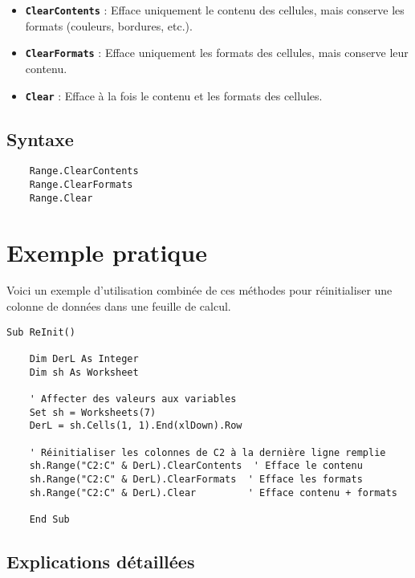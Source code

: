 \documentclass[a4paper,12pt]{report}
\begin{document}
\begin{itemize}
	\item \textbf{\texttt{ClearContents}} : Efface uniquement le contenu des cellules, mais conserve les formats (couleurs, bordures, etc.).
	\item \textbf{\texttt{ClearFormats}} : Efface uniquement les formats des cellules, mais conserve leur contenu.
	\item \textbf{\texttt{Clear}} : Efface à la fois le contenu et les formats des cellules.
\end{itemize}

\subsection*{Syntaxe}
\begin{verbatim}
	Range.ClearContents
	Range.ClearFormats
	Range.Clear
\end{verbatim}

\section{Exemple pratique}

Voici un exemple d'utilisation combinée de ces méthodes pour réinitialiser une colonne de données dans une feuille de calcul.
\newpage
\begin{lstlisting}[language=vbscript, caption={Exemple de réinitialisation avec \texttt{Clear}}]
	Sub ReInit()
	
	Dim DerL As Integer
	Dim sh As Worksheet
	
	' Affecter des valeurs aux variables
	Set sh = Worksheets(7)
	DerL = sh.Cells(1, 1).End(xlDown).Row
	
	' Réinitialiser les colonnes de C2 à la dernière ligne remplie
	sh.Range("C2:C" & DerL).ClearContents  ' Efface le contenu
	sh.Range("C2:C" & DerL).ClearFormats  ' Efface les formats
	sh.Range("C2:C" & DerL).Clear         ' Efface contenu + formats
	
	End Sub
\end{lstlisting}

\subsection*{Explications détaillées}
\end{document}
